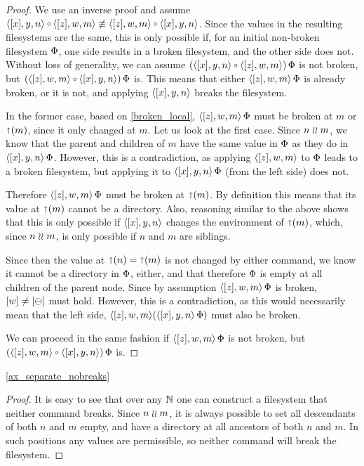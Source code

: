 \begin{proof}
We use an inverse proof and assume $\cxynv\cc\czwmv \nequiv \czwmv\cc\cxynv$.
Since the values in the resulting filesystems are the same,
this is only possible if, for an initial non-broken filesystem $\Phi$,
one side results in a broken filesystem, and the other side does not.
Without loss of generality, we can assume
$(\cxynv\cc\czwmv)\aFS$ is not broken, but $(\czwmv\cc\cxynv)\aFS$ is.
This means that either $\langle{[z],w,m}\rangle\,\Phi$ is already broken, or it is not, and applying $\langle{[x],y,n}\rangle$
breaks the filesystem.

In the former case, based on \cref{broken_local}, 
$\langle{[z],w,m}\rangle\,\Phi$ must be broken at $m$ or $\mathord{\shortuparrow}({m})$, since it only changed at $m$.
Let us look at the first case.
Since $n\mathrel{\wr\wr} m$, we know that the parent and children of $m$ have the same value
in $\Phi$ as they do in $\langle{[x],y,n}\rangle\,\Phi$. However, this is a contradiction,
as applying $\langle{[z],w,m}\rangle$ to $\Phi$ leads to a broken filesystem,
but applying it to $\langle{[x],y,n}\rangle\,\Phi$ (from the left side) does not.

Therefore $\langle{[z],w,m}\rangle\,\Phi$ must be broken at $\mathord{\shortuparrow}({m})$.
By definition this means that its value at $\mathord{\shortuparrow}({m})$ cannot be a directory.
Also, reasoning similar to the above shows that this is only possible if $\langle{[x],y,n}\rangle$ changes
the environment of $\mathord{\shortuparrow}({m})$, which, since $n\mathrel{\wr\wr} m$, is only possible
if $n$ and $m$ are siblings.

Since then the value at $\mathord{\shortuparrow}({n})=\mathord{\shortuparrow}({m})$ is not changed by either command,
we know it cannot be a directory in $\Phi$, either, and that therefore
$\Phi$ is empty at all children of the parent node.
Since by assumption $\langle{[z],w,m}\rangle\,\Phi$ is broken, $[w]\neq[\ominus]$ must hold.
However, this is a contradiction, as this would necessarily mean that
the left side, $\langle{[z],w,m}\rangle(\langle{[x],y,n}\rangle\,\Phi)$ must also be broken.

We can proceed in the same fashion if $\langle{[z],w,m}\rangle\,\Phi$ is not broken, but
$(\czwmv\cc\cxynv)\aFS$ is.
\end{proof}

\cref{ax_separate_nobreaks}

\begin{proof}
It is easy to see that over any $\mathbb{N}$ one can construct a filesystem that neither command breaks.
Since $n\mathrel{\wr\wr} m$, it is always possible to set all descendants of both $n$ and $m$ empty,
and have a directory at all ancestors of both $n$ and $m$. In such positions any values are permissible,
so neither command will break the filesystem.
\end{proof}

